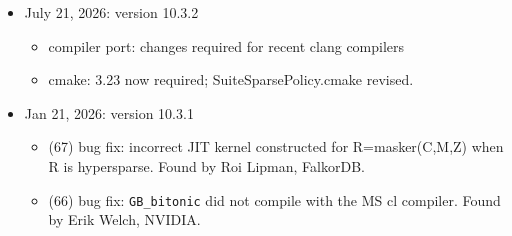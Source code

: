 \begin{itemize}
    \begin{itemize}
    \item Memory arenas: allows the use of multiple memory allocators.
        See Section~\ref{sec:arenas}.
    \item substantial revision to MATLAB/Octave interface: GhB is a new handle
        object, so that m-files and mexFunctions can modify their inputs.  This
        allows pending work to be left in a GhB matrix, speeding up algorithms
        that use GraphBLAS.
    \item \verb'GrB_Matrix_extractElement': no longer waits if the entry can be
        found without finalizing pending tuples
    \item \verb'GxB_atfork_(prepare,parent,child)': added to support an
        application needing to fork, while still using GraphBLAS.
    \item static \verb'GrB_Matrix' headers: used internally; removed, except for
        \verb'GB_Scalar_wrap', and unary/binary ops, to simplify memory arena
        feature and future CUDA kernels.
    \item MATLAB/Octave (68) bug fix:  v10.0 to v10.3 do not properly load GrB
        hypersparse matrices from \verb'*.mat' files saved by v9 and earlier,
        when using the built-in load/save methods in MATLAB.  The load/save of
        a serialized blob is not affected by this bug.
    \end{itemize}

\item July 21, 2026: version 10.3.2

    \begin{itemize}
    \item compiler port: changes required for recent clang compilers
    \item cmake: 3.23 now required; SuiteSparsePolicy.cmake revised.
    \end{itemize}

\item Jan 21, 2026: version 10.3.1

    \begin{itemize}
    \item (67) bug fix:  incorrect JIT kernel constructed for R=masker(C,M,Z)
        when R is hypersparse.  Found by Roi Lipman, FalkorDB.
    \item (66) bug fix:  \verb'GB_bitonic' did not compile with the MS cl
        compiler.  Found by Erik Welch, NVIDIA.
    \end{itemize}


\end{itemize}
